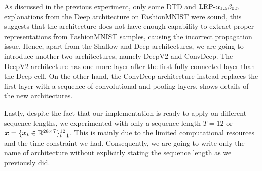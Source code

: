 As discussed in the previous experiment, only some DTD and $\text{LRP-}\alpha_{1.5}\beta_{0.5}$ explanations from the Deep architecture on FashionMNIST were sound, this suggests that the architecture does not have enough capability to extract proper representations from FashionMNIST samples, causing the incorrect propagation issue. Hence, apart from the Shallow and Deep architectures, we are going to  introduce another two architectures, namely DeepV2 and ConvDeep. The DeepV2 architecture has one more layer after the first fully-connected layer than the Deep cell. On the other hand, the ConvDeep architecture instead replaces the first layer with  a sequence of convolutional and pooling layers. \addfigure{\ref{fig:deep_conv_arch}} shows details of the new architectures.




\begin{figure}[!htb]
\centering

     \hfill

\label{fig:deep_conv_arch}
\end{figure}

Lastly, despite the fact that  our implementation is ready to apply on different sequence lengths,  we experimented with only a sequence length $T=12$ or $\boldsymbol{x} = \{ \boldsymbol{x}_t \in \mathbb{R}^{28 \times 7}\}_{t=1}^{12}$. This is mainly due to the limited computational resources and the time constraint we had. Consequently, we are going to write only the name of architecture without explicitly stating the sequence length as we previously did.


